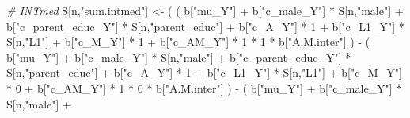 \documentclass[
]{book}
\newenvironment{Shaded}{\begin{snugshade}}{\end{snugshade}}
\newcommand{\CommentTok}[1]{\textcolor[rgb]{0.56,0.35,0.01}{\textit{#1}}}
\newcommand{\DecValTok}[1]{\textcolor[rgb]{0.00,0.00,0.81}{#1}}
\newcommand{\NormalTok}[1]{#1}
\newcommand{\OtherTok}[1]{\textcolor[rgb]{0.56,0.35,0.01}{#1}}
\newcommand{\SpecialCharTok}[1]{\textcolor[rgb]{0.00,0.00,0.00}{#1}}
\newcommand{\StringTok}[1]{\textcolor[rgb]{0.31,0.60,0.02}{#1}}
\begin{document}
\begin{Shaded}
\begin{Highlighting}[]
    \CommentTok{\# INTmed }
\NormalTok{    S[n,}\StringTok{"sum.intmed"}\NormalTok{] }\OtherTok{\textless{}{-}}\NormalTok{ ( ( b[}\StringTok{"mu\_Y"}\NormalTok{] }\SpecialCharTok{+} 
\NormalTok{                               b[}\StringTok{"c\_male\_Y"}\NormalTok{] }\SpecialCharTok{*}\NormalTok{ S[n,}\StringTok{"male"}\NormalTok{] }\SpecialCharTok{+} 
\NormalTok{                               b[}\StringTok{"c\_parent\_educ\_Y"}\NormalTok{] }\SpecialCharTok{*}\NormalTok{ S[n,}\StringTok{"parent\_educ"}\NormalTok{] }\SpecialCharTok{+} 
\NormalTok{                               b[}\StringTok{"c\_A\_Y"}\NormalTok{] }\SpecialCharTok{*} \DecValTok{1} \SpecialCharTok{+} 
\NormalTok{                               b[}\StringTok{"c\_L1\_Y"}\NormalTok{] }\SpecialCharTok{*}\NormalTok{ S[n,}\StringTok{"L1"}\NormalTok{] }\SpecialCharTok{+}
\NormalTok{                               b[}\StringTok{"c\_M\_Y"}\NormalTok{] }\SpecialCharTok{*} \DecValTok{1} \SpecialCharTok{+}
\NormalTok{                               b[}\StringTok{"c\_AM\_Y"}\NormalTok{] }\SpecialCharTok{*} \DecValTok{1} \SpecialCharTok{*} \DecValTok{1} \SpecialCharTok{*}\NormalTok{ b[}\StringTok{"A.M.inter"}\NormalTok{] ) }\SpecialCharTok{{-}} 
\NormalTok{                             ( b[}\StringTok{"mu\_Y"}\NormalTok{] }\SpecialCharTok{+} 
\NormalTok{                                 b[}\StringTok{"c\_male\_Y"}\NormalTok{] }\SpecialCharTok{*}\NormalTok{ S[n,}\StringTok{"male"}\NormalTok{] }\SpecialCharTok{+} 
\NormalTok{                                 b[}\StringTok{"c\_parent\_educ\_Y"}\NormalTok{] }\SpecialCharTok{*}\NormalTok{ S[n,}\StringTok{"parent\_educ"}\NormalTok{] }\SpecialCharTok{+} 
\NormalTok{                                 b[}\StringTok{"c\_A\_Y"}\NormalTok{] }\SpecialCharTok{*} \DecValTok{1} \SpecialCharTok{+} 
\NormalTok{                                 b[}\StringTok{"c\_L1\_Y"}\NormalTok{] }\SpecialCharTok{*}\NormalTok{ S[n,}\StringTok{"L1"}\NormalTok{] }\SpecialCharTok{+}
\NormalTok{                                 b[}\StringTok{"c\_M\_Y"}\NormalTok{] }\SpecialCharTok{*} \DecValTok{0} \SpecialCharTok{+}
\NormalTok{                                 b[}\StringTok{"c\_AM\_Y"}\NormalTok{] }\SpecialCharTok{*} \DecValTok{1} \SpecialCharTok{*} \DecValTok{0} \SpecialCharTok{*}\NormalTok{ b[}\StringTok{"A.M.inter"}\NormalTok{] ) }\SpecialCharTok{{-}} 
\NormalTok{                             ( b[}\StringTok{"mu\_Y"}\NormalTok{] }\SpecialCharTok{+} 
\NormalTok{                                 b[}\StringTok{"c\_male\_Y"}\NormalTok{] }\SpecialCharTok{*}\NormalTok{ S[n,}\StringTok{"male"}\NormalTok{] }\SpecialCharTok{+} 

\end{Highlighting}
\end{Shaded}
\end{document}
